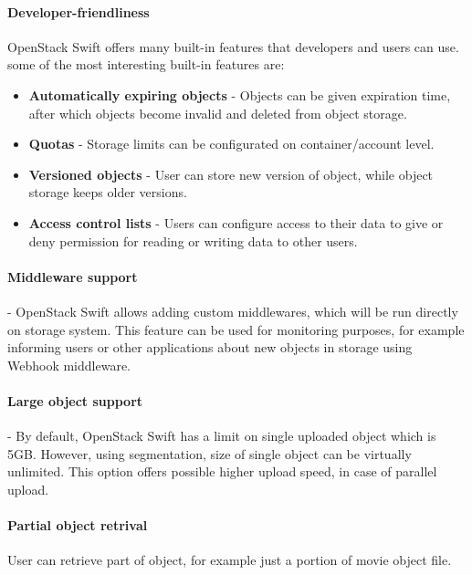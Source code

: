     \paragraph{Developer-friendliness}
    OpenStack Swift offers many built-in features that developers and users can use. some of the most interesting built-in features are\cite{swiftOpenStackSwift}:
    \begin{itemize}
        \item \textbf{Automatically expiring objects} - Objects can be given expiration time, after which objects become invalid and deleted from object storage.
        \item \textbf{Quotas} - Storage limits can be configurated on container/account level.
        \item \textbf{Versioned objects} - User can store new version of object, while object storage keeps older versions.
        \item \textbf{Access control lists} - Users can configure access to their data to give or deny permission for reading or writing data to other users.
    \end{itemize}

    \paragraph{Middleware support}
    - OpenStack Swift allows adding custom middlewares, which will be run directly on storage system\cite{swiftEssentials}. This feature can be used for monitoring purposes, for example informing users or other applications about new objects in storage using Webhook middleware.

    \paragraph{Large object support}
    - By default, OpenStack Swift has a limit on single uploaded object which is 5GB. However, using segmentation, size of single object can be virtually unlimited. This option offers possible higher upload speed, in case of parallel upload\cite{swiftLOS}.

    \paragraph{Partial object retrival}
    User can retrieve part of object, for example just a portion of movie object file\cite{swiftImplementingCloudStorage}.

